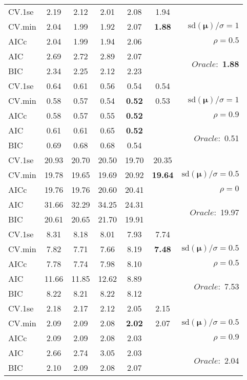 \begin{table}
\begin{center}
\begin{tabular}{l*{5}{c}|r}
 \hline 
CV.1se & 2.19 & 2.12 & 2.01 & 2.08 & 1.94 & \\
CV.min & 2.04 & 1.99 & 1.92 & 2.07 & {\bf 1.88} &  $\mathrm{sd}(\mathbf{\mu})/\sigma=1$ \\
AICc & 2.04 & 1.99 & 1.94 & 2.06 & & $\rho=0.5$ \\
AIC & 2.69 & 2.72 & 2.89 & 2.07 & &  \multirow{2}{*}{$Oracle: $ {\bf 1.88}} \\
BIC & 2.34 & 2.25 & 2.12 & 2.23 & &  \\
 \hline 
CV.1se & 0.64 & 0.61 & 0.56 & 0.54 & 0.54 & \\
CV.min & 0.58 & 0.57 & 0.54 & {\bf 0.52} & 0.53 &  $\mathrm{sd}(\mathbf{\mu})/\sigma=1$ \\
AICc & 0.58 & 0.57 & 0.55 & {\bf 0.52} & & $\rho=0.9$ \\
AIC & 0.61 & 0.61 & 0.65 & {\bf 0.52} & &  \multirow{2}{*}{$Oracle: $ 0.51} \\
BIC & 0.69 & 0.68 & 0.68 & 0.54 & &  \\
 \hline 
CV.1se & 20.93 & 20.70 & 20.50 & 19.70 & 20.35 & \\
CV.min & 19.78 & 19.65 & 19.69 & 20.92 & {\bf 19.64} &  $\mathrm{sd}(\mathbf{\mu})/\sigma=0.5$ \\
AICc & 19.76 & 19.76 & 20.60 & 20.41 & & $\rho=0$ \\
AIC & 31.66 & 32.29 & 34.25 & 24.31 & &  \multirow{2}{*}{$Oracle: $ 19.97} \\
BIC & 20.61 & 20.65 & 21.70 & 19.91 & &  \\
 \hline 
CV.1se & 8.31 & 8.18 & 8.01 & 7.93 & 7.74 & \\
CV.min & 7.82 & 7.71 & 7.66 & 8.19 & {\bf 7.48} &  $\mathrm{sd}(\mathbf{\mu})/\sigma=0.5$ \\
AICc & 7.78 & 7.74 & 7.98 & 8.10 & & $\rho=0.5$ \\
AIC & 11.66 & 11.85 & 12.62 & 8.89 & &  \multirow{2}{*}{$Oracle: $ 7.53} \\
BIC & 8.22 & 8.21 & 8.22 & 8.12 & &  \\
 \hline 
CV.1se & 2.18 & 2.17 & 2.12 & 2.05 & 2.15 & \\
CV.min & 2.09 & 2.09 & 2.08 & {\bf 2.02} & 2.07 &  $\mathrm{sd}(\mathbf{\mu})/\sigma=0.5$ \\
AICc & 2.09 & 2.09 & 2.08 & 2.03 & & $\rho=0.9$ \\
AIC & 2.66 & 2.74 & 3.05 & 2.03 & &  \multirow{2}{*}{$Oracle: $ 2.04} \\
BIC & 2.10 & 2.09 & 2.08 & 2.07 & &  \\
 \hline 
\end{tabular}
\end{center}
\vspace{-1cm}
\end{table}




